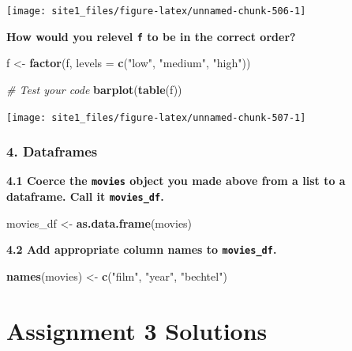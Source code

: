 \documentclass[]{book}
\newenvironment{Shaded}{\begin{snugshade}}{\end{snugshade}}
\newcommand{\CommentTok}[1]{\textcolor[rgb]{0.56,0.35,0.01}{\textit{#1}}}
\newcommand{\DataTypeTok}[1]{\textcolor[rgb]{0.13,0.29,0.53}{#1}}
\newcommand{\KeywordTok}[1]{\textcolor[rgb]{0.13,0.29,0.53}{\textbf{#1}}}
\newcommand{\NormalTok}[1]{#1}
\newcommand{\StringTok}[1]{\textcolor[rgb]{0.31,0.60,0.02}{#1}}
\begin{document}
\begin{center}\texttt{[image: site1\_files/figure-latex/unnamed-chunk-506-1]} \end{center}

\textbf{How would you relevel \texttt{f} to be in the correct order?}

\begin{Shaded}
\begin{Highlighting}[]
\NormalTok{f <-}\StringTok{ }\KeywordTok{factor}\NormalTok{(f, }\DataTypeTok{levels =} \KeywordTok{c}\NormalTok{(}\StringTok{"low"}\NormalTok{, }\StringTok{"medium"}\NormalTok{, }\StringTok{"high"}\NormalTok{))}

\CommentTok{# Test your code}
\KeywordTok{barplot}\NormalTok{(}\KeywordTok{table}\NormalTok{(f))}
\end{Highlighting}
\end{Shaded}

\begin{center}\texttt{[image: site1\_files/figure-latex/unnamed-chunk-507-1]} \end{center}

\hypertarget{dataframes-1}{%
\subsubsection*{4. Dataframes}\label{dataframes-1}}

\textbf{4.1 Coerce the \texttt{movies} object you made above from a list to a dataframe. Call it \texttt{movies\_df}.}

\begin{Shaded}
\begin{Highlighting}[]
\NormalTok{movies_df <-}\StringTok{ }\KeywordTok{as.data.frame}\NormalTok{(movies)}
\end{Highlighting}
\end{Shaded}

\textbf{4.2 Add appropriate column names to \texttt{movies\_df}.}

\begin{Shaded}
\begin{Highlighting}[]
\KeywordTok{names}\NormalTok{(movies) <-}\StringTok{ }\KeywordTok{c}\NormalTok{(}\StringTok{"film"}\NormalTok{, }\StringTok{"year"}\NormalTok{, }\StringTok{"bechtel"}\NormalTok{)}
\end{Highlighting}
\end{Shaded}

\hypertarget{assignment-3-solutions}{%
\section{Assignment 3 Solutions}\label{assignment-3-solutions}}
\end{document}
